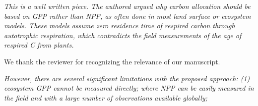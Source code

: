 %
%
%

\emph{This is a well written piece. The authored argued why carbon
allocation should be based on GPP rather than NPP, as often done in most
land surface or ecosystem models. These models assume zero residence
time of respired carbon through autotrophic respiration, which
contradicts the field measurements of the age of respired C from
plants.}

We thank the reviewer for recognizing the relevance of our manuscript.

\emph{However, there are several significant limitations with the
proposed approach: (1) ecosystem GPP cannot be measured directly; where
NPP can be easily measured in the field and with a large number of
observations available globally;}


